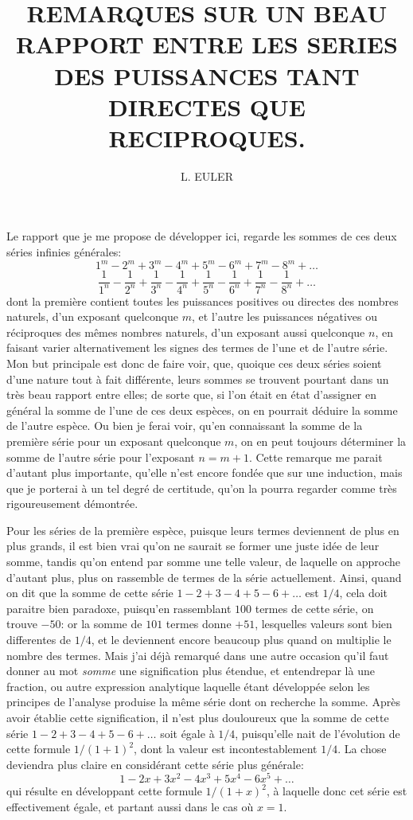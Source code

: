 \documentclass[12pt]{article}
\title{REMARQUES SUR UN BEAU RAPPORT ENTRE LES SERIES DES PUISSANCES TANT DIRECTES QUE RECIPROQUES.}
\author{L. EULER}
\date{}
\theoremstyle{definition}
\newcounter{prop}[section]
\begin{document}
\maketitle

Le rapport que je me propose de développer ici, regarde les sommes de ces deux séries infinies générales:
\[1^m - 2^m + 3^m - 4^m + 5^m - 6^m + 7^m - 8^m + \dots \tag*{(1)} \]
\[\frac{1}{1^n} - \frac{1}{2^n} + \frac{1}{3^n} - \frac{1}{4^n} + \frac{1}{5^n} - \frac{1}{6^n} + \frac{1}{7^n} - \frac{1}{8^n} + \dots \tag*{(2)} \]
dont la première contient toutes les puissances positives ou directes des nombres naturels, d'un exposant quelconque $m$, et l'autre les puissances négatives ou réciproques des mêmes nombres naturels, d'un exposant aussi quelconque $n$, en faisant varier alternativement les signes des termes de l'une et de l'autre série. Mon but principale est donc de faire voir, que, quoique ces deux séries soient d'une nature tout à fait différente, leurs sommes se trouvent pourtant dans un très beau rapport entre elles; de sorte que, si l'on était en état d'assigner en général la somme de l'une de ces deux espèces, on en pourrait déduire la somme de l'autre espèce. Ou bien je ferai voir, qu'en connaissant la somme de la première série pour un exposant quelconque $m$, on en peut toujours déterminer la somme de l'autre série pour l'exposant $n=m+1$. Cette remarque me parait d'autant plus importante, qu'elle n'est encore fondée que sur une induction, mais que je porterai à un tel degré de certitude, qu'on la pourra regarder comme très rigoureusement démontrée.

Pour les séries de la première espèce, puisque leurs termes deviennent de plus en plus grands, il est bien vrai qu'on ne saurait se former une juste idée de leur somme, tandis qu'on entend par somme une telle valeur, de laquelle on approche d'autant plus, plus on rassemble de termes de la série actuellement. Ainsi, quand on dit que la somme de cette série $1-2+3-4+5-6 + \dots$ est $1/4$, cela doit paraitre bien paradoxe, puisqu'en rassemblant $100$ termes de cette série, on trouve $-50$: or la somme de $101$ termes donne $+51$, lesquelles valeurs sont bien differentes de $1/4$, et le deviennent encore beaucoup plus quand on multiplie le nombre des termes. Mais j'ai déjà remarqué dans une autre occasion qu'il faut donner au mot \textit{somme} une signification plus étendue, et entendrepar là une fraction, ou autre expression analytique laquelle étant développée selon les principes de l'analyse produise la même série dont on recherche la somme. Après avoir établie cette signification, il n'est plus douloureux que la somme de cette série $1-2+3-4+5-6 + \dots$ soit égale à $1/4$, puisqu'elle nait de l'évolution de cette formule $1/(1+1)^2$, dont la valeur est incontestablement $1/4$. La chose deviendra plus claire en considérant cette série plus générale:
$$1 - 2x + 3x^2 - 4x^3 + 5x^4 - 6x^5 + \dots$$
qui résulte en développant cette formule $1/(1+x)^2$, à laquelle donc cet série est effectivement égale, et partant aussi dans le cas où $x=1$.
\end{document}

